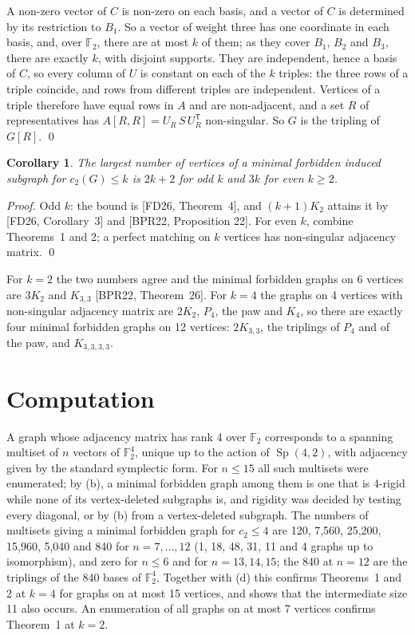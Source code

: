\documentclass[11pt,letterpaper,reqno]{amsart}
\theoremstyle{spaced}
\newtheorem{corollary}[theorem]{Corollary}
\begin{document}
A non-zero vector of \(C\) is non-zero on each basis, and a vector of \(C\) is determined by its restriction to \(B_1\). So a vector of weight three has one coordinate in each basis, and, over \(\mathbb{F}_2\), there are at most \(k\) of them; as they cover \(B_1\), \(B_2\) and \(B_3\), there are exactly \(k\), with disjoint supports. They are independent, hence a basis of \(C\), so every column of \(U\) is constant on each of the \(k\) triples: the three rows of a triple coincide, and rows from different triples are independent. Vertices of a triple therefore have equal rows in \(A\) and are non-adjacent, and a set \(R\) of representatives has \(A[R, R] = U_R\, S\, U_R^{\mathsf T}\) non-singular. So \(G\) is the tripling of \(G[R]\). \qed

\begin{corollary}
The largest number of vertices of a minimal forbidden induced subgraph for \(c_2(G) \le k\) is \(2k+2\) for odd \(k\) and \(3k\) for even \(k \ge 2\).
\end{corollary}

\emph{Proof.} Odd \(k\): the bound is {[}FD26, Theorem~4{]}, and \((k+1)K_2\) attains it by {[}FD26, Corollary~3{]} and {[}BPR22, Proposition 22{]}. For even \(k\), combine Theorems~1 and 2; a perfect matching on \(k\) vertices has non-singular adjacency matrix. \qed

For \(k = 2\) the two numbers agree and the minimal forbidden graphs on 6 vertices are \(3K_2\) and \(K_{3,3}\) {[}BPR22, Theorem~26{]}. For \(k = 4\) the graphs on 4 vertices with non-singular adjacency matrix are \(2K_2\), \(P_4\), the paw and \(K_4\), so there are exactly four minimal forbidden graphs on 12 vertices: \(2K_{3,3}\), the triplings of \(P_4\) and of the paw, and \(K_{3,3,3,3}\).

\newpage\hypertarget{computation}{%
\section{Computation}\label{computation}}

A graph whose adjacency matrix has rank 4 over \(\mathbb{F}_2\) corresponds to a spanning multiset of \(n\) vectors of \(\mathbb{F}_2^4\), unique up to the action of \(\operatorname{Sp}(4, 2)\), with adjacency given by the standard symplectic form. For \(n \le 15\) all such multisets were enumerated; by (b), a minimal forbidden graph among them is one that is 4-rigid while none of its vertex-deleted subgraphs is, and rigidity was decided by testing every diagonal, or by (b) from a vertex-deleted subgraph. The numbers of multisets giving a minimal forbidden graph for \(c_2 \le 4\) are 120, 7,560, 25,200, 15,960, 5,040 and 840 for \(n = 7, \dots, 12\) (1, 18, 48, 31, 11 and 4 graphs up to isomorphism), and zero for \(n \le 6\) and for \(n = 13, 14, 15\); the 840 at \(n = 12\) are the triplings of the 840 bases of \(\mathbb{F}_2^4\). Together with (d) this confirms Theorems~1 and 2 at \(k = 4\) for graphs on at most 15 vertices, and shows that the intermediate size 11 also occurs. An enumeration of all graphs on at most 7 vertices confirms Theorem~1 at \(k = 2\).
\end{document}
